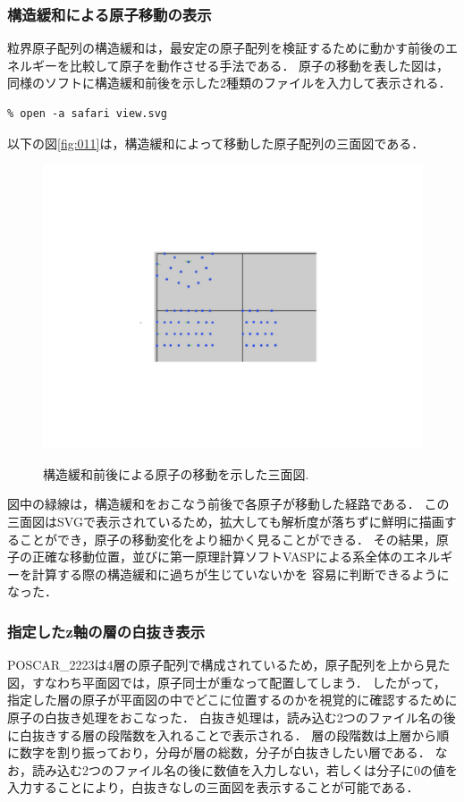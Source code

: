 \subsubsection{構造緩和による原子移動の表示}
粒界原子配列の構造緩和は，最安定の原子配列を検証するために動かす前後のエネルギーを比較して原子を動作させる手法である．
原子の移動を表した図は，同様のソフトに構造緩和前後を示した2種類のファイルを入力して表示される．
\begin{lstlisting}[style=customCsh,basicstyle={\scriptsize\ttfamily}]
% ruby viewer.rb POSCAR_after POSCAR_before
% open -a safari view.svg 
\end{lstlisting}
以下の図\ref{fig:011}は，構造緩和によって移動した原子配列の三面図である．

\begin{figure}[htbp]\begin{center}
\includegraphics[width=12cm,bb= 0 0 937 753]{../figs/./boundary_narita.011.jpeg}
\caption{構造緩和前後による原子の移動を示した三面図.}
\label{fig:011}
\label{default}\end{center}\end{figure}
図中の緑線は，構造緩和をおこなう前後で各原子が移動した経路である．
この三面図はSVGで表示されているため，拡大しても解析度が落ちずに鮮明に描画することができ，原子の移動変化をより細かく見ることができる．
その結果，原子の正確な移動位置，並びに第一原理計算ソフトVASPによる系全体のエネルギーを計算する際の構造緩和に過ちが生じていないかを
容易に判断できるようになった．

\subsubsection{指定したz軸の層の白抜き表示}
POSCAR\_2223は4層の原子配列で構成されているため，原子配列を上から見た図，すなわち平面図では，原子同士が重なって配置してしまう．
したがって，指定した層の原子が平面図の中でどこに位置するのかを視覚的に確認するために原子の白抜き処理をおこなった．
白抜き処理は，読み込む2つのファイル名の後に白抜きする層の段階数を入れることで表示される．
層の段階数は上層から順に数字を割り振っており，分母が層の総数，分子が白抜きしたい層である．
なお，読み込む2つのファイル名の後に数値を入力しない，若しくは分子に0の値を入力することにより，白抜きなしの三面図を表示することが可能である．


